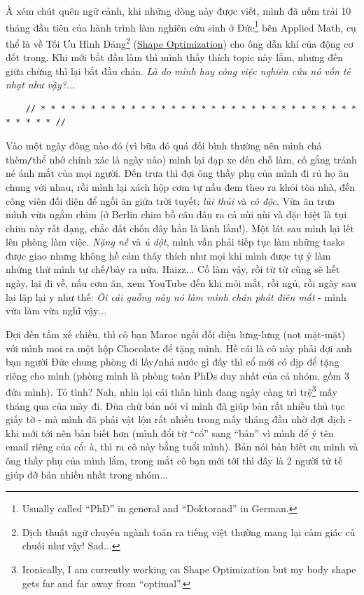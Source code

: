 \documentclass[12pt]{article}
\numberwithin{equation}{section}
\begin{document}
À xém chút quên ngữ cảnh, khi những dòng này được viết, mình đã nếm trải 10 tháng đầu tiên của hành trình làm nghiên cứu sinh ở Đức\footnote{Usually called ``PhD'' in general and ``Doktorand'' in German.} bên Applied Math, cụ thể là về Tối Ưu Hình Dáng\footnote{Dịch thuật ngữ chuyên ngành toán ra tiếng việt thường mang lại cảm giác củ chuối như vậy! Sad$\ldots$} (\href{https://en.wikipedia.org/wiki/Shape_optimization}{Shape Optimization}) cho ống dẫn khí của động cơ đốt trong. Khi mới bắt đầu làm thì mình thấy thích topic này lắm, nhưng đến giữa chừng thì lại bắt đầu chán. \textit{Là do mình hay công việc nghiên cứu nó vốn tẻ nhạt như vậy?}$\ldots$

\begin{verbatim}
    // * * * * * * * * * * * * * * * * * * * * * * * * * * * * * * * * * * * * * //
\end{verbatim}

\noindent
{} Vào một ngày đông nào đó (vì bữa đó quá đỗi bình thường nên mình chả thèm\texttt{/}thể nhớ chính xác là ngày nào) mình lại đạp xe đến chỗ làm, cố gắng tránh né ánh mắt của mọi người. Đến trưa thì đợi ông thầy phụ của mình đi rủ họ ăn chung với nhau, rồi mình lại xách hộp cơm tự nấu đem theo ra khỏi tòa nhà, đến công viên đối diện để ngồi ăn giữa trời tuyết: \textit{lủi thủi} và \textit{cô độc}. Vừa ăn trưa mình vừa ngắm chim (ở Berlin chim bồ câu đâu ra cả nùi nùi và đặc biệt là tụi chim này rất dạng, chắc đất chốn đây hẳn là lành lắm!). Một lát sau mình lại lết lên phòng làm việc. \textit{Nặng nề} và \textit{ủ dột}, mình vẫn phải tiếp tục làm những tasks được giao nhưng không hề cảm thấy thích như mọi khi mình được tự ý làm những thứ mình tự chế\texttt{/}bày ra nữa. Haizz$\ldots$ Cố làm vậy, rồi từ từ cũng sẽ hết ngày, lại đi về, nấu cơm ăn, xem YouTube đến khi mỏi mắt, rồi ngủ, rồi ngày sau lại lặp lại y như thế: \textit{Ôi cái guồng này nó làm mình chán phát điên mất} - mình vừa làm vừa nghĩ vậy$\ldots$

Đợi đến tầm xế chiều, thì cô bạn Maroc ngồi đối diện lưng-lưng (not mặt-mặt) với mình moi ra một hộp Chocolate để tặng mình. Hề cái là cô này phải đợi anh bạn người Đức chung phòng đi lấy\texttt{/}nhả nước gì đấy thì cổ mới có dịp để tặng riêng cho mình (phòng mình là phòng toàn PhDs duy nhất của cả nhóm, gồm 3 đứa mình). Tỏ tình? Nah, nhìn lại cái thân hình đang ngày càng trì trệ\footnote{Ironically, I am currently working on Shape Optimization but my body shape gets far and far away from ``optimal''.} mấy tháng qua của mày đi. Đùa chứ bản nói vì mình đã giúp bản rất nhiều thủ tục giấy tờ - mà mình đã phải vật lộn rất nhiều trong mấy tháng đầu nhờ đợt dịch - khi mới tới nên bản biết hơn (mình đổi từ ``cổ'' sang ``bản'' vì mình để ý tên email riêng của cổ: à, thì ra cô này bằng tuổi mình). Bản nói bản biết ơn mình và ông thầy phụ của mình lắm, trong mắt cô bạn mới tới thì đây là 2 người tử tế giúp đỡ bản nhiều nhất trong nhóm$\ldots$
\end{document}
